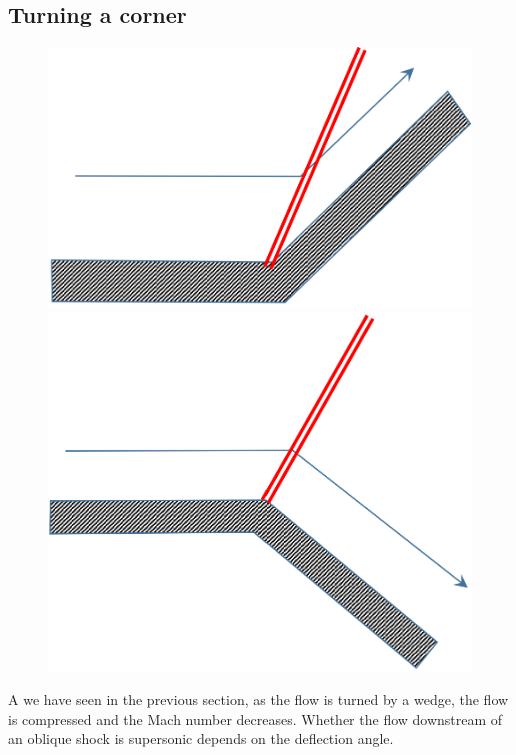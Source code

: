 \subsection{Turning a corner}
\begin{figure}[H]
    \centering
    \begin{minipage}{.5\textwidth}
        \centering
        \includegraphics[width=.8\linewidth]{./img/diagram20.png}
    \end{minipage}%
    \begin{minipage}{.5\textwidth}
        \centering
        \includegraphics[width=.8\linewidth]{./img/diagram21.png}
    \end{minipage}
\end{figure}
A we have seen in the previous section, as the flow is turned by a wedge, the flow is compressed and the Mach number decreases. Whether the flow downstream of an oblique shock is supersonic depends on the deflection angle.
